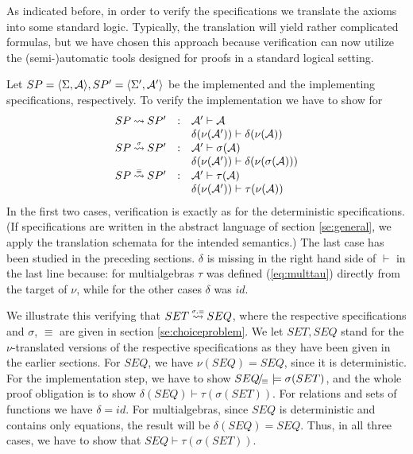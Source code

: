 As indicated before, in order to verify the specifications we translate the axioms into some standard logic. Typically, the translation will yield rather complicated formulas, but we have chosen this approach because verification can now utilize the (semi-)automatic tools designed for proofs in a standard logical setting.

Let $SP=\langle\Sigma,{\cal A}\rangle, SP'=\langle\Sigma',{\cal A}'\rangle$ be the implemented and the implementing specifications, respectively. To verify the implementation we have to show for
\begin{equation}\label{eq:oblig}
\begin{array}{rcl}
SP\mathbin{\leadsto} SP' & : &{\cal A}'\vdash{\cal A} \\
& & \delta(\nu({\cal A}'))\vdash \delta(\nu({\cal A})) \\ SP\mathbin{\stackrel{\scriptscriptstyle \sigma}{\mathbin{\leadsto}}} SP' & : & {\cal A}'\vdash \sigma({\cal A}) \\ 
& & \delta(\nu({\cal A}'))\vdash \delta(\nu(\sigma({\cal A}))) \\ SP\mathbin{\stackrel{\scriptscriptstyle \equiv}{\mathbin{\leadsto}}} SP' & : & {\cal A}'\vdash \tau({\cal A}) \\ 
& & \delta(\nu({\cal A}'))\vdash \tau(\nu({\cal A})) \\ \end{array}
\end{equation}
In the first two cases, verification is exactly as for the deterministic
specifications. (If specifications are written in the abstract language of
section \ref{se:general}, we apply the translation schemata for the intended
semantics.) The last case has been studied in the preceding
sections. $\delta$ is missing in the right hand side of $\vdash$ in the last
line because: for multialgebras $\tau$ was defined (\ref{eq:multtau}) directly from the target
of $\nu$, while for the other cases $\delta$ was $id$.

We illustrate this verifying that $SET\mathbin{\stackrel{\scriptscriptstyle \sigma,\equiv}{\mathbin{\leadsto}}}SEQ$, where the respective specifications and $\sigma$, $\equiv$ are given in section \ref{se:choiceproblem}. We let $SET,SEQ$ stand for the $\nu$-translated versions of the respective specifications as they have been given in the earlier sections. For $SEQ$, we have $\nu(SEQ)=SEQ$, since it is deterministic.
For the implementation step, we have to show $SEQ\!{\textstyle /}\!_\equiv\models \sigma(SET)$, and the whole proof obligation is to show $\delta(SEQ)\vdash \tau(\sigma(SET)).$ For relations and sets of functions we have $\delta=id$. For multialgebras, since $SEQ$ is deterministic and contains only equations, the result will be $\delta(SEQ)=SEQ$.
Thus, in all three cases, we have to show that $SEQ\vdash\tau(\sigma(SET)).$ 

